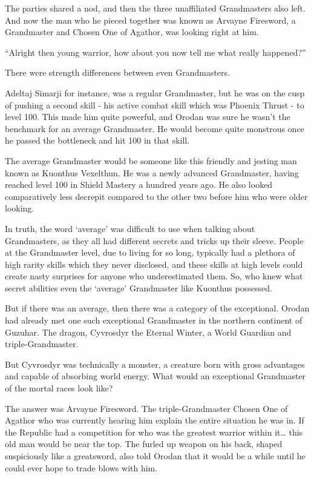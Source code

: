 \documentclass[a4paper,10pt]{book}
\begin{document}
The parties shared a nod, and then the three unaffiliated Grandmasters also left. And now the man who he pieced together was known as Arvayne Firesword, a Grandmaster and Chosen One of Agathor, was looking right at him.\par
“Alright then young warrior, how about you now tell me what really happened?”\par
\par
There were strength differences between even Grandmasters.\par
Adeltaj Simarji for instance, was a regular Grandmaster, but he was on the cusp of pushing a second skill - his active combat skill which was Phoenix Thrust - to level 100. This made him quite powerful, and Orodan was sure he wasn’t the benchmark for an average Grandmaster. He would become quite monstrous once he passed the bottleneck and hit 100 in that skill.\par
The average Grandmaster would be someone like this friendly and jesting man known as Kuonthus Vexelthun. He was a newly advanced Grandmaster, having reached level 100 in Shield Mastery a hundred years ago. He also looked comparatively less decrepit compared to the other two before him who were older looking.\par
In truth, the word ‘average’ was difficult to use when talking about Grandmasters, as they all had different secrets and tricks up their sleeve. People at the Grandmaster level, due to living for so long, typically had a plethora of high rarity skills which they never disclosed, and these skills at high levels could create nasty surprises for anyone who underestimated them. So, who knew what secret abilities even the ‘average’ Grandmaster like Kuonthus possessed.\par
But if there was an average, then there was a category of the exceptional. Orodan had already met one such exceptional Grandmaster in the northern continent of Guzuhar. The dragon, Cyvrosdyr the Eternal Winter, a World Guardian and triple-Grandmaster.\par
But Cyvrosdyr was technically a monster, a creature born with gross advantages and capable of absorbing world energy. What would an exceptional Grandmaster of the mortal races look like?\par
The answer was Arvayne Firesword. The triple-Grandmaster Chosen One of Agathor who was currently hearing him explain the entire situation he was in. If the Republic had a competition for who was the greatest warrior within it… this old man would be near the top. The furled up weapon on his back, shaped suspiciously like a greatsword, also told Orodan that it would be a while until he could ever hope to trade blows with him.\par
\end{document}
